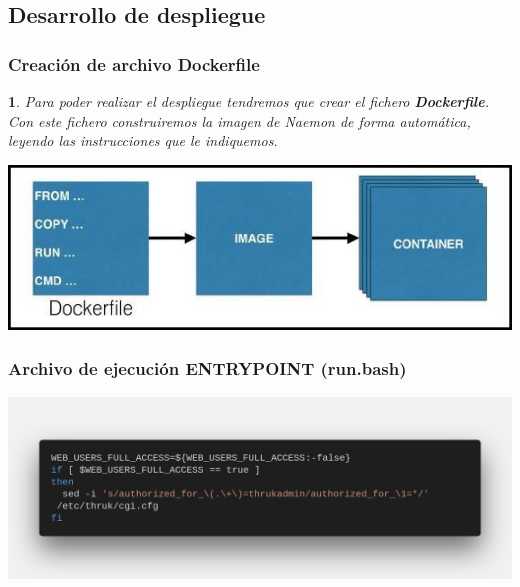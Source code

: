 \documentclass{beamer}
\theoremstyle{plain}
\theoremstyle{definition}
\theoremstyle{plain}
\newtheorem{prop}[thm]{}
\theoremstyle{definition}
\theoremstyle{remark}
\theoremstyle{definition}
\begin{document}
\subsection{Desarrollo de despliegue}
\begin{frame}
	\frametitle{Creación de archivo Dockerfile}
	\begin{prop}
		
		Para poder realizar el despliegue tendremos que crear el fichero \textbf{Dockerfile}. Con este fichero construiremos la imagen de Naemon de forma automática, leyendo las instrucciones que le indiquemos.
	\end{prop}
	\centering
	\includegraphics[scale=0.4]{imagenes/dockerfile-image.png}
	
\end{frame}



\begin{frame}
		\frametitle{Archivo de ejecución ENTRYPOINT (run.bash)}
	\centering
	\includegraphics[scale=0.2]{imagenes/accesothrukadmin.png}
	
\end{frame}
\end{document}
